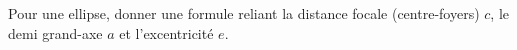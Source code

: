  Pour une ellipse, donner une formule reliant la distance focale (centre-foyers) $c$, le demi grand-axe $a$ et l'excentricit\'e $e$. \bigskip